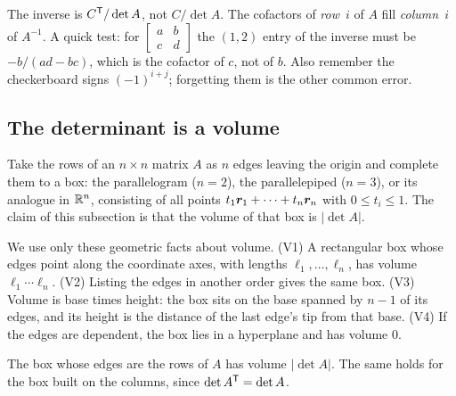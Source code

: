 \begin{trap}
The inverse is $C^{\mathsf{T}}/\det A$, not $C/\det A$. The cofactors of \emph{row}~$i$ of $A$ fill
\emph{column}~$i$ of $A^{-1}$. A quick test: for
$\left[\begin{smallmatrix} a&b\\ c&d\end{smallmatrix}\right]$ the $(1,2)$ entry of the
inverse must be $-b/(ad-bc)$, which is the cofactor of $c$, not of $b$. Also remember the
checkerboard signs $(-1)^{i+j}$; forgetting them is the other common error.
\end{trap}

\subsection{The determinant is a volume}

Take the rows of an $n\times n$ matrix $A$ as $n$ edges leaving the origin and complete
them to a box: the parallelogram ($n=2$), the parallelepiped ($n=3$), or its analogue in
$\mathbb{R}^{n}$, consisting of all points $t_1\boldsymbol{r}_1+\dots+t_n\boldsymbol{r}_n$ with $0\le t_i\le 1$.
The claim of this subsection is that the volume of that box is $|\det A|$.

We use only these geometric facts about volume. (V1) A rectangular box whose edges point
along the coordinate axes, with lengths $\ell_1,\dots,\ell_n$, has volume
$\ell_1\cdots\ell_n$. (V2) Listing the edges in another order gives the same box. (V3)
Volume is base times height: the box sits on the base spanned by $n-1$ of its edges, and its
height is the distance of the last edge's tip from that base. (V4) If the edges are dependent,
the box lies in a hyperplane and has volume $0$.

\begin{theorem}\label{thm:u22-volume}
The box whose edges are the rows of $A$ has volume $|\det A|$. The same holds for the box
built on the columns, since $\det A^{\mathsf{T}}=\det A$.
\end{theorem}

